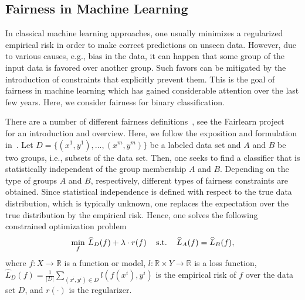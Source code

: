 \documentclass[letterpaper]{article} %
\DeclareMathOperator{\st}{s.t.}
\newcommand{\setR}{\mathbb{R}}
\begin{document}
\subsection{Fairness in Machine Learning}
In classical machine learning approaches, one usually minimizes a regularized empirical risk in order to make correct predictions on unseen data. However, due to various causes, e.g., bias in the data, it can happen that some group of the input data is favored over another group. %
Such favors can be mitigated by the introduction of  constraints that explicitly prevent them. This is the goal of fairness in machine learning which has gained considerable attention over the last few years. Here, we consider fairness for binary classification.

There are a number of different fairness definitions~\cite{AgarwalBD0W18,barocas-hardt-narayanan,DoniniOBSP18}, see the Fairlearn project~\cite{bird2020fairlearn, fairlearn} for an introduction and overview. Here, we follow the exposition and formulation in~\cite{DoniniOBSP18}. Let $D=\{(x^1, y^1), \ldots, (x^m, y^m)\}$ be a labeled data set and $A$ and $B$ be two groups, i.e., subsets of the data set. Then, one seeks to find a classifier that is statistically independent of the group membership $A$ and $B$. %
Depending on the type of groups $A$ and $B$, respectively, different types of fairness constraints are obtained. Since statistical independence is defined with respect to the true data distribution, which is typically unknown, one replaces the expectation over the true distribution by the empirical risk.
Hence, one solves the following constrained optimization problem
\[
\min_{f}\: \widehat L_D(f) + \lambda \cdot r(f)\\
  \quad \st\quad \widehat L_A (f) = \widehat L_B (f),
\]
where $f\colon X\to\setR$ is a function or model, $l\colon \setR\times Y\to \setR$  is a loss function, $\widehat L_D(f) = \frac{1}{|D|} \sum_{(x^i, y^i) \in D} l(f(x^i), y^i)$ is the empirical risk of $f$ over the data set $D$, and $r(\cdot )$ is the regularizer. %
\end{document}
